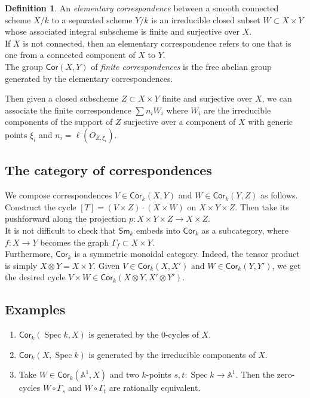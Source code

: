 \documentclass[leqno, openany]{memoir}
\theoremstyle{definition}
\newtheorem{defn}[thm]{Definition}
\theoremstyle{remark}
\theoremstyle{plain}
\theoremstyle{definition}
\theoremstyle{remark}
\newcommand{\A}{\mathbb{A}}
\newcommand{\Sm}{\mathsf{Sm}}
\newcommand{\Cor}{\mathsf{Cor}}
\DeclareMathOperator{\Spec}{Spec}
\begin{document}
\begin{defn} An \textit{elementary correspondence} between a smooth connected
    scheme $X/k$ to a separated scheme $Y/k$ is an irreducible closed subset
    $W\subset X\times Y$ whose associated integral subscheme is finite and
    surjective over $X$. \\ 

If $X$ is not connected, then an elementary correspondence refers to one that
is one from a connected component of $X$ to $Y$.   \\ 

The group $\Cor(X, Y)$ of \textit{finite correspondences} is the free abelian
group generated by the elementary correspondences.  \end{defn} 

Then given a closed subscheme $Z\subset X\times Y$ finite and surjective over
$X$, we can associate the finite correspondence $\sum n_iW_i$ where $W_i$ are
the irreducible components of the support of $Z$ surjective over a component of
$X$ with generic points $\xi_i$ and $n_i =\ell ( O_{Z, \xi_i} )$. \\ 

\subsection{The category of correspondences}

We compose correspondences $V\in\Cor_k(X, Y)$ and $W\in \Cor_k(Y, Z)$ as
follows.  Construct the cycle $[T] = (V\times Z)\cdot (X\times W)$ on $X\times
Y\times Z$.  Then take its pushforward along the projection $p:X\times Y\times
Z\rightarrow X\times Z$. \\ 

It is not difficult to check that $\Sm_k$ embeds into $\Cor_k$ as a
subcategory, where $f:X\rightarrow Y$ becomes the graph $\Gamma_f\subset
X\times Y$. \\ 

Furthermore, $\Cor_k$ is a symmetric monoidal category.  Indeed, the tensor
product is simply $X\otimes Y=X\times Y$.  Given $V\in \Cor_k(X, X')$ and $W\in
\Cor_k(Y, Y')$, we get the desired cycle $V\times W\in \Cor_k(X\otimes Y,
X'\otimes Y')$. 

\subsection{Examples} \begin{enumerate} \item $\Cor_k(\Spec k, X)$ is generated
    by the $0$-cycles of $X$. 

\item $\Cor_k(X, \Spec k)$ is generated by the irreducible components of $X$. 

\item Take $W\in \Cor_k(\A^1, X)$ and two $k$-points $s, t:\Spec k\rightarrow
\A^1$.  Then the zero-cycles $W\circ \Gamma_s$ and $W\circ \Gamma_t$ are
rationally equivalent.  \end{enumerate}
\end{document}
